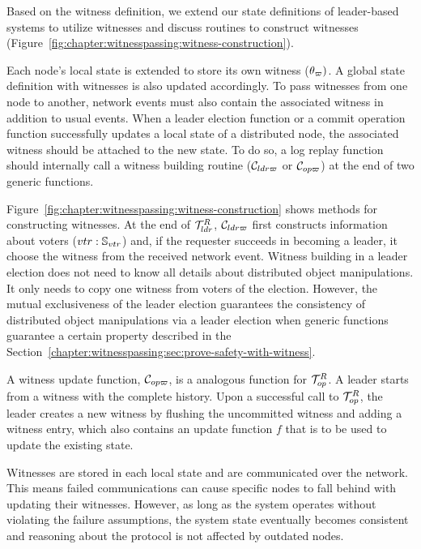 Based on the witness definition, we extend our state definitions of
leader-based systems to utilize witnesses and discuss routines to construct
witnesses (Figure~\ref{fig:chapter:witnesspassing:witness-construction}).

Each node's local state is extended to store its own witness ($\theta_\varpi)$.
A global state definition with witnesses is also updated accordingly.
To pass witnesses from one node to another,
network events must also contain the associated witness in addition to usual events.
When a leader election function or a commit operation function successfully updates a local state of a distributed node, the associated witness should be
attached to the new state. To do so, a log replay function should internally call a witness building routine ($\mathcal{C}_{ldr\varpi}$ or $\mathcal{C}_{op\varpi}$) at the end of two generic functions.

Figure~\ref{fig:chapter:witnesspassing:witness-construction} shows methods for constructing witnesses.
At the end of $\mathcal{T}^{R}_{ldr}$, $\mathcal{C}_{ldr\varpi}$ first constructs information about voters ($vtr:\mathbb{S}_{vtr}$) and, if the requester succeeds in becoming a leader,
it choose the witness from the received network event. 
Witness building in a leader election does not need to know 
all details about distributed object manipulations.
It only needs to copy one witness from voters of the election.
However, the mutual exclusiveness of the leader election guarantees the consistency of distributed object manipulations via a leader election when generic functions guarantee a 
 certain property described in the Section~\ref{chapter:witnesspassing:sec:prove-safety-with-witness}. 
 
A witness update function, $\mathcal{C}_{op\varpi}$, is a analogous function for $\mathcal{T}^{R}_{op}$.
A leader starts from a witness with the complete history.
Upon a successful call to $\mathcal{T}^{R}_{op}$, the leader creates a new witness by flushing the uncommitted witness and 
adding a witness entry, which also contains an update function $f$ that is to be used
to update the existing state.




Witnesses are stored in each local state and are communicated over the network.
This means failed communications can
cause specific nodes to fall behind with updating their witnesses.
However, as long as the system operates without violating the failure 
assumptions, the system state eventually becomes consistent and reasoning 
about the protocol is not affected by outdated nodes.

